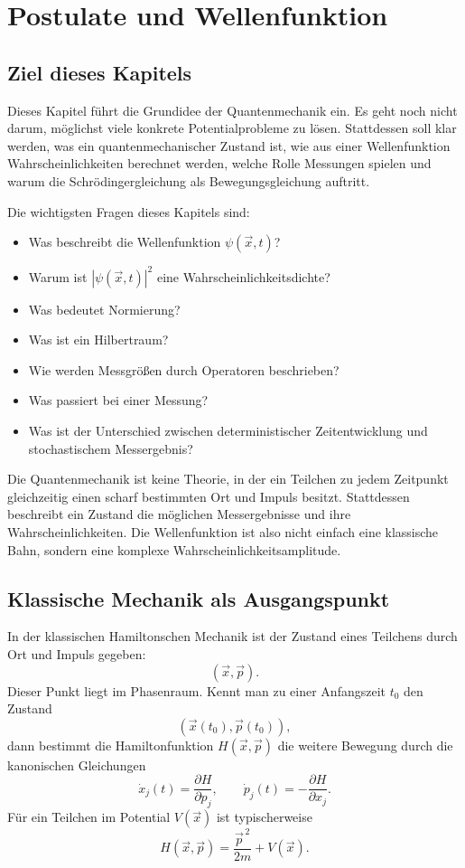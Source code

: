 \chapter{Postulate und Wellenfunktion}

\section{Ziel dieses Kapitels}

Dieses Kapitel führt die Grundidee der Quantenmechanik ein. Es geht noch nicht darum, möglichst viele konkrete Potentialprobleme zu lösen. Stattdessen soll klar werden, was ein quantenmechanischer Zustand ist, wie aus einer Wellenfunktion Wahrscheinlichkeiten berechnet werden, welche Rolle Messungen spielen und warum die Schrödingergleichung als Bewegungsgleichung auftritt.

Die wichtigsten Fragen dieses Kapitels sind:
\begin{itemize}
    \item Was beschreibt die Wellenfunktion $\psi(\vec{x},t)$?
    \item Warum ist $|\psi(\vec{x},t)|^2$ eine Wahrscheinlichkeitsdichte?
    \item Was bedeutet Normierung?
    \item Was ist ein Hilbertraum?
    \item Wie werden Messgrößen durch Operatoren beschrieben?
    \item Was passiert bei einer Messung?
    \item Was ist der Unterschied zwischen deterministischer Zeitentwicklung und stochastischem Messergebnis?
\end{itemize}

\begin{conceptbox}
Die Quantenmechanik ist keine Theorie, in der ein Teilchen zu jedem Zeitpunkt gleichzeitig einen scharf bestimmten Ort und Impuls besitzt. Stattdessen beschreibt ein Zustand die möglichen Messergebnisse und ihre Wahrscheinlichkeiten. Die Wellenfunktion ist also nicht einfach eine klassische Bahn, sondern eine komplexe Wahrscheinlichkeitsamplitude.
\end{conceptbox}

\section{Klassische Mechanik als Ausgangspunkt}

In der klassischen Hamiltonschen Mechanik ist der Zustand eines Teilchens durch Ort und Impuls gegeben:
\[
    (\vec{x},\vec{p}).
\]
Dieser Punkt liegt im Phasenraum. Kennt man zu einer Anfangszeit $t_0$ den Zustand
\[
    (\vec{x}(t_0),\vec{p}(t_0)),
\]
dann bestimmt die Hamiltonfunktion $H(\vec{x},\vec{p})$ die weitere Bewegung durch die kanonischen Gleichungen
\[
    \dot{x}_j(t)=\frac{\partial H}{\partial p_j},
    \qquad
    \dot{p}_j(t)=-\frac{\partial H}{\partial x_j}.
\]
Für ein Teilchen im Potential $V(\vec{x})$ ist typischerweise
\[
    H(\vec{x},\vec{p})=\frac{\vec{p}^{\,2}}{2m}+V(\vec{x}).
\]


